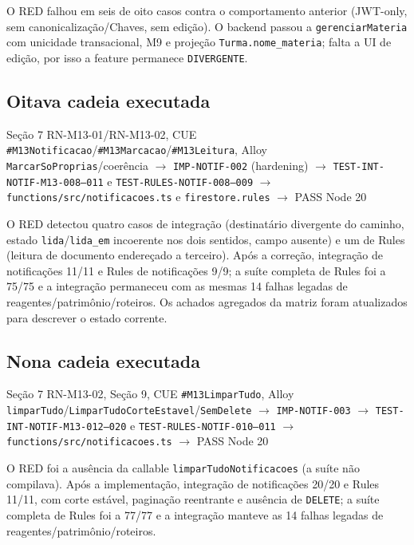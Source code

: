 O RED falhou em seis de oito casos contra o comportamento anterior (JWT-only, sem
canonicalização/Chaves, sem edição). O backend passou a \texttt{gerenciarMateria}
com unicidade transacional, M9 e projeção \texttt{Turma.nome\_materia}; falta a UI
de edição, por isso a feature permanece \texttt{DIVERGENTE}.

\subsection{Oitava cadeia executada}

\begin{center}
Seção 7 RN-M13-01/RN-M13-02, CUE \texttt{\#M13Notificacao}/\texttt{\#M13Marcacao}/\texttt{\#M13Leitura}, Alloy \texttt{MarcarSoProprias}/coerência
$\rightarrow$ \texttt{IMP-NOTIF-002} (hardening)
$\rightarrow$ \texttt{TEST-INT-NOTIF-M13-008--011} e \texttt{TEST-RULES-NOTIF-008--009}
$\rightarrow$ \nolinkurl{functions/src/notificacoes.ts} e \nolinkurl{firestore.rules}
$\rightarrow$ PASS Node 20
\end{center}

O RED detectou quatro casos de integração (destinatário divergente do caminho,
estado \texttt{lida}/\texttt{lida\_em} incoerente nos dois sentidos, campo
ausente) e um de Rules (leitura de documento endereçado a terceiro). Após a
correção, integração de notificações 11/11 e Rules de notificações 9/9; a suíte
completa de Rules foi a 75/75 e a integração permaneceu com as mesmas 14 falhas
legadas de reagentes/patrimônio/roteiros. Os achados agregados da matriz foram
atualizados para descrever o estado corrente.

\subsection{Nona cadeia executada}

\begin{center}
Seção 7 RN-M13-02, Seção 9, CUE \texttt{\#M13LimparTudo}, Alloy \texttt{limparTudo}/\texttt{LimparTudoCorteEstavel}/\texttt{SemDelete}
$\rightarrow$ \texttt{IMP-NOTIF-003}
$\rightarrow$ \texttt{TEST-INT-NOTIF-M13-012--020} e \texttt{TEST-RULES-NOTIF-010--011}
$\rightarrow$ \nolinkurl{functions/src/notificacoes.ts}
$\rightarrow$ PASS Node 20
\end{center}

O RED foi a ausência da callable \texttt{limparTudoNotificacoes} (a suíte não
compilava). Após a implementação, integração de notificações 20/20 e Rules
11/11, com corte estável, paginação reentrante e ausência de \texttt{DELETE};
a suíte completa de Rules foi a 77/77 e a integração manteve as 14 falhas
legadas de reagentes/patrimônio/roteiros.

